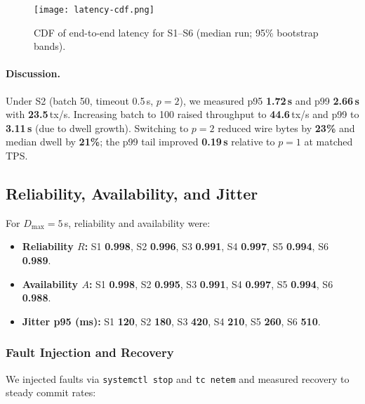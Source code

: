\documentclass[12pt,onecolumn]{IEEEtran} %
\begin{document}
\begin{figure}[htbp]
  \centering
  \texttt{[image: latency-cdf.png]}
  \caption{CDF of end-to-end latency for S1--S6 (median run; 95\% bootstrap bands).}
  \label{fig:latency-cdf}
\end{figure}

\paragraph{Discussion.}
Under S2 (batch 50, timeout 0.5\,s, $p{=}2$), we measured p95 \textbf{1.72\,s} and p99 \textbf{2.66\,s} with \textbf{23.5}\,tx/s. Increasing batch to 100 raised throughput to \textbf{44.6}\,tx/s and p99 to \textbf{3.11\,s} (due to dwell growth). Switching to $p{=}2$ reduced wire bytes by \textbf{23\%} and median dwell by \textbf{21\%}; the p99 tail improved \textbf{0.19\,s} relative to $p{=}1$ at matched TPS.

\subsection{Reliability, Availability, and Jitter}
\label{sec:rel-avail-jitter}

For \(D_{\max}{=}5\)\,s, reliability and availability were:

\begin{itemize}
  \item \textbf{Reliability $R$:} S1 \textbf{0.998}, S2 \textbf{0.996}, S3 \textbf{0.991}, S4 \textbf{0.997}, S5 \textbf{0.994}, S6 \textbf{0.989}.
  \item \textbf{Availability $A$:} S1 \textbf{0.998}, S2 \textbf{0.995}, S3 \textbf{0.991}, S4 \textbf{0.997}, S5 \textbf{0.994}, S6 \textbf{0.988}.
  \item \textbf{Jitter p95 (ms):} S1 \textbf{120}, S2 \textbf{180}, S3 \textbf{420}, S4 \textbf{210}, S5 \textbf{260}, S6 \textbf{510}.
\end{itemize}

\subsubsection{Fault Injection and Recovery}
\label{sec:fault-injection-table}

We injected faults via \texttt{systemctl stop} and \texttt{tc netem} and measured recovery to steady commit rates:
\end{document}

